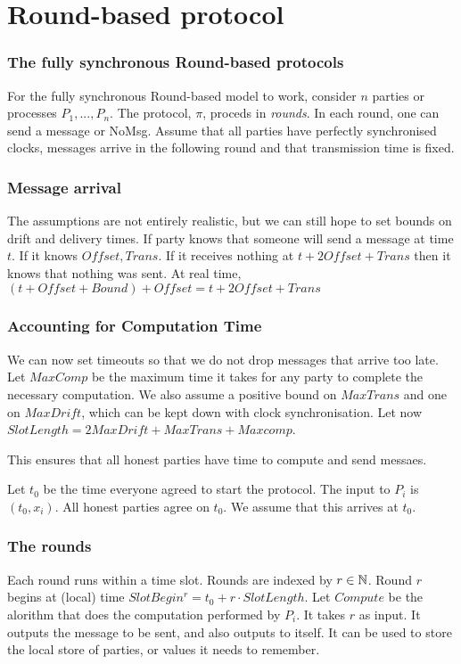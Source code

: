 \section{Round-based protocol}
        \begin{frame}
            \frametitle{The fully synchronous Round-based protocols}
                For the fully synchronous Round-based model to work, consider $n$ parties or processes $P_1, ..., P_n$. The protocol, $\pi$, proceds in \textit{rounds}. In each round, one can send a message or NoMsg. Assume that all parties have perfectly synchronised clocks, messages arrive in the following round and that transmission time is fixed. 
        \end{frame}
        \begin{frame}
            \frametitle{Message arrival}
                The assumptions are not entirely realistic, but we can still hope to set bounds on drift and delivery times. If party knows that someone will send a message at time $t$. If it knows $Offset, Trans$. If it receives nothing at $t + 2Offset + Trans$ then it knows that nothing was sent. At real time, $(t + Offset + Bound) + Offset = t + 2Offset + Trans$
        \end{frame}
        \begin{frame}
            \frametitle{Accounting for Computation Time}
                We can now set timeouts so that we do not drop messages that arrive too late. Let $MaxComp$ be the maximum time it takes for any party to complete the necessary computation. We also assume a positive bound on $MaxTrans$ and one on $MaxDrift$, which can be kept down with clock synchronisation. Let now $SlotLength = 2MaxDrift + MaxTrans + Maxcomp$. 
                
                This ensures that all honest parties have time to compute and send messaes. 

                Let $t_0$ be the time everyone agreed to start the protocol. The input to $P_i$ is $(t_0, x_i)$. All honest parties agree on $t_0$. We assume that this arrives at $t_0$. 
        \end{frame}

        \begin{frame}
            \frametitle{The rounds}
                Each round runs within a time slot. Rounds are indexed by $r \in \mathbb{N}$. Round $r$ begins at (local) time $SlotBegin^r = t_0 + r \cdot SlotLength$. Let $Compute$ be the alorithm that does the computation performed by $P_i$. It takes $r$ as input. It outputs the message to be sent, and also outputs to itself. It can be used to store the local store of parties, or values it needs to remember. 
        \end{frame}

